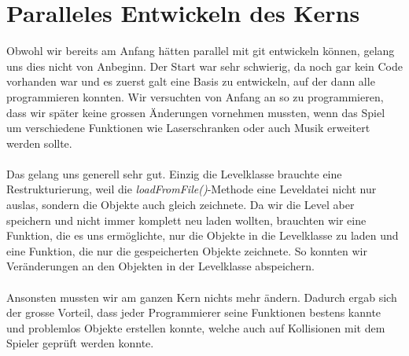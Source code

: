 \documentclass[11pt,a4paper]{scrbook}
\begin{document}
\section{Paralleles Entwickeln des Kerns}
Obwohl wir bereits am Anfang hätten parallel mit git entwickeln können, gelang uns dies nicht von Anbeginn. Der Start war sehr schwierig, da noch gar kein Code vorhanden war
und es zuerst galt eine Basis zu entwickeln, auf der dann alle programmieren konnten. Wir versuchten von Anfang an so zu programmieren,
dass wir später keine grossen Änderungen vornehmen mussten, wenn das Spiel um verschiedene Funktionen wie Laserschranken oder auch Musik erweitert werden sollte.
\\
\\
Das gelang uns generell sehr gut. Einzig die Levelklasse brauchte eine Restrukturierung, weil die \textit{loadFromFile()}-Methode eine Leveldatei nicht nur auslas,
sondern die Objekte auch gleich zeichnete. Da wir die Level aber speichern und nicht immer komplett neu laden wollten, brauchten wir eine
Funktion, die es uns ermöglichte, nur die Objekte in die Levelklasse zu laden und eine Funktion, die nur die gespeicherten Objekte zeichnete. So konnten wir Veränderungen an den Objekten in der Levelklasse abspeichern.
\\
\\
Ansonsten mussten wir am ganzen Kern nichts mehr ändern. Dadurch ergab sich der grosse Vorteil, dass jeder Programmierer seine
Funktionen bestens kannte und problemlos Objekte erstellen konnte, welche auch auf Kollisionen mit dem Spieler geprüft werden konnte.
\end{document}
